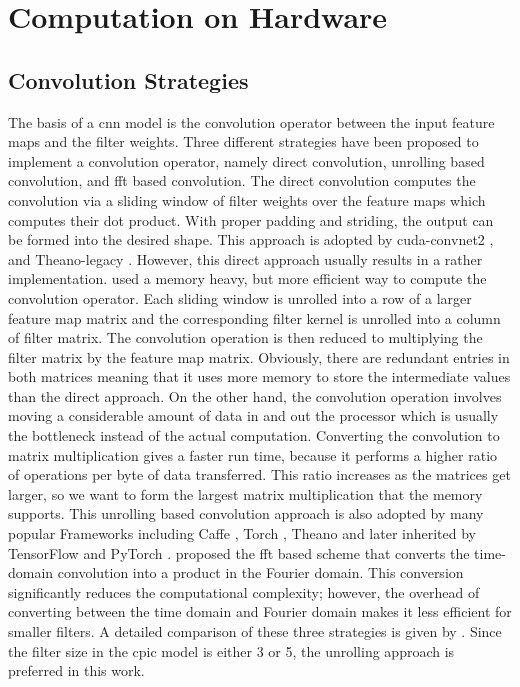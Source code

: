 \documentclass{article}
\begin{document}
\section{Computation on Hardware}
\label{sec:hardware}
%

\subsection{Convolution Strategies}
\label{sec:conv}
%
The basis of a \gls{cnn} model is the convolution operator between the input feature maps and the filter weights.
Three different strategies have been proposed to implement a convolution operator, namely direct convolution, unrolling based convolution, and \gls{fft} based convolution.
The direct convolution computes the convolution via a sliding window of filter weights over the feature maps which computes their dot product.
With proper padding and striding, the output can be formed into the desired shape.
This approach is adopted by cuda-convnet2 \autocite{krizhevsky2014one}, and Theano-legacy \autocite{bergstra2010theano,bastien2012theano}.
However, this direct approach usually results in a rather implementation.
\textcite{chetlur2014cudnn} used a memory heavy, but more efficient way to compute the convolution operator.
Each sliding window is unrolled into a row of a larger feature map matrix and the corresponding filter kernel is unrolled into a column of filter matrix.
The convolution operation is then reduced to multiplying the filter matrix by the feature map matrix.
Obviously, there are redundant entries in both matrices meaning that it uses more memory to store the intermediate values than the direct approach.
On the other hand, the convolution operation involves moving a considerable amount of data in and out the processor which is usually the bottleneck instead of the actual computation.
Converting the convolution to matrix multiplication gives a faster run time, because it performs a higher ratio of operations per byte of data transferred.
This ratio increases as the matrices get larger, so we want to form the largest matrix multiplication that the memory supports.
This unrolling based convolution approach is also adopted by many popular Frameworks including Caffe \autocite{jia2014caffe}, Torch \autocite{collobert2011torch7}, Theano \autocite{bastien2012theano} and later inherited by TensorFlow \autocite{abadi2016tensorflow} and PyTorch \autocite{paszke2017automatic}.
\textcite{vasilache2014fast} proposed the \gls{fft} based scheme that converts the time-domain convolution into a product in the Fourier domain.
This conversion significantly reduces the computational complexity; however, the overhead of converting between the time domain and Fourier domain makes it less efficient for smaller filters.
A detailed comparison of these three strategies is given by \textcite{li2016performance}.
Since the filter size in the \gls{cpic} model is either 3 or 5, the unrolling approach is preferred in this work.
\end{document}
